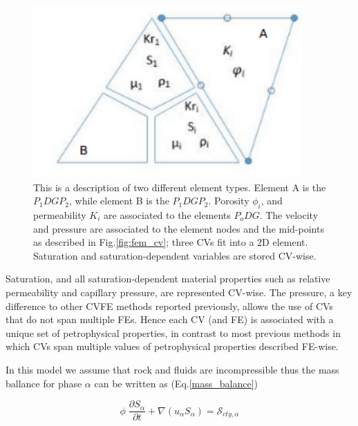 \documentclass[preprint,authoryear,12pt]{elsarticle}
\begin{document}
\begin{figure}[h] 
\centering
\includegraphics[width=.5\textwidth]{./Pics/element_n.pdf}
\caption{This is a description of two different element types. Element A is the $P_{1}DGP_{2}$, while element B is the $P_{1}DGP_{2}$. Porosity $\phi_{i}$, and permeability $K_{i}$ are associated to the elements $P_{o}DG$. The velocity and pressure are associated to the element nodes and the mid-points as described in Fig.\ref{fig:fem_cv}; three CVs fit into a $2$D element. Saturation and saturation-dependent variables are stored CV-wise. }
\label{fig:fem_elem}
\end{figure}

Saturation, and all saturation-dependent material properties such as relative permeability and capillary pressure, are represented CV-wise. The pressure, a key difference to other CVFE methods reported previously, allows the use of CVs that do not span multiple FEs. Hence each CV (and FE) is associated with a unique set of petrophysical properties, in contrast to most previous methods in which CVs span multiple values of petrophysical properties described FE-wise.

In this model we assume that rock and fluids are incompressible thus the mass ballance for phase $\alpha$ can be written as (Eq.\ref{mass_balance})

\begin{equation}
\phi \; \frac{\partial S_{\alpha}}{\partial t} + \nabla (u_{\alpha}S_{\alpha})= \mathcal{S}_{cty,\alpha}
\label{mass_balance}
\end{equation}
 

\end{document}
